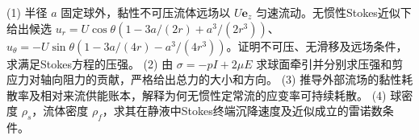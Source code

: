 (1) 半径 \(a\) 固定球外，黏性不可压流体远场以 \(U\mathbf e_z\) 匀速流动。无惯性Stokes近似下给出候选
\(u_r=U\cos\theta(1-3a/(2r)+a^3/(2r^3))\)、
\(u_\theta=-U\sin\theta(1-3a/(4r)-a^3/(4r^3))\)。证明不可压、无滑移及远场条件，求满足Stokes方程的压强。
(2) 由 \(\sigma=-pI+2\mu E\) 求球面牵引并分别求压强和剪应力对轴向阻力的贡献，严格给出总力的大小和方向。
(3) 推导外部流场的黏性耗散率及相对来流供能账本，解释为何无惯性定常流的应变率可持续耗散。
(4) 球密度 \(\rho_s\)，流体密度 \(\rho_f\)，求其在静液中Stokes终端沉降速度及近似成立的雷诺数条件。
